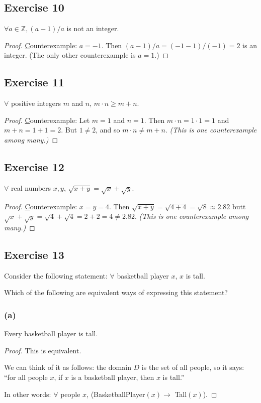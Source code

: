 \documentclass[14pt]{extarticle}
\newcommand{\Z}{\mathbb{Z}}
\newcommand{\fa}{\forall}
\begin{document}
\subsection{Exercise 10}
$\fa a \in \Z, (a-1)/a$ is not an integer.

\begin{proof}
    {\underline Counterexample}: $a = -1$. Then $(a-1)/a = (-1-1)/(-1) = 2$ is an integer. (The only other counterexample is $a = 1$.)
\end{proof}

\subsection{Exercise 11}
$\fa$ positive integers $m$ and $n$, $m \cdot n \geq m + n$.

\begin{proof}
    {\underline Counterexample}: Let $m = 1$ and $n = 1$. Then $m\cdot n = 1\cdot 1 = 1$ and $m + n = 1 + 1 = 2$. But $1 \neq 2$, and so $m\cdot n \neq m + n$. {\it (This is one counterexample among many.)}
\end{proof}

\subsection{Exercise 12}
$\fa$ real numbers $x, y$, $\sqrt{x + y} = \sqrt{x} + \sqrt{y}$.

\begin{proof}
    {\underline Counterexample}: $x = y = 4$. Then $\sqrt{x + y} = \sqrt{4 + 4} = \sqrt{8} \approx 2.82$ butt $\sqrt{x} + \sqrt{y} = \sqrt{4} + \sqrt{4} = 2 + 2 = 4 \neq 2.82$. {\it (This is one counterexample among many.)}
\end{proof}

\subsection{Exercise 13}
Consider the following statement: $\fa$ basketball player $x$, $x$ is tall.

Which of the following are equivalent ways of expressing this statement?

\subsubsection{(a)}
Every basketball player is tall.

\begin{proof}
    This is equivalent.

    We can think of it as follows: the domain $D$ is the set of all people, so it says: ``for all people $x$, if $x$ is a basketball player, then $x$ is tall.''

    In other words: $\fa$ people $x$, (BasketballPlayer$(x) \to$ Tall$(x)$).
\end{proof}
\end{document}
